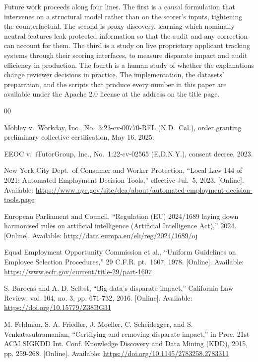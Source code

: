 \documentclass[conference]{IEEEtran}
\begin{document}
Future work proceeds along four lines. The first is a causal formulation that
intervenes on a structural model rather than on the scorer's inputs, tightening the
counterfactual. The second is proxy discovery, learning which nominally neutral
features leak protected information so that the audit and any correction can account
for them. The third is a study on live proprietary applicant tracking systems through
their scoring interfaces, to measure disparate impact and audit efficiency in
production. The fourth is a human study of whether the explanations change reviewer
decisions in practice. The implementation, the datasets' preparation, and the scripts
that produce every number in this paper are available under the Apache 2.0 license at
the address on the title page.

\begin{thebibliography}{00}
\small

 Mobley v.\ Workday, Inc., No.\ 3:23-cv-00770-RFL (N.D.\ Cal.), order granting preliminary collective certification, May 16, 2025.

 EEOC v.\ iTutorGroup, Inc., No.\ 1:22-cv-02565 (E.D.N.Y.), consent decree, 2023.

 New York City Dept.\ of Consumer and Worker Protection, ``Local Law 144 of 2021: Automated Employment Decision Tools,'' effective Jul.\ 5, 2023. [Online]. Available: \url{https://www.nyc.gov/site/dca/about/automated-employment-decision-tools.page}

 European Parliament and Council, ``Regulation (EU) 2024/1689 laying down harmonised rules on artificial intelligence (Artificial Intelligence Act),'' 2024. [Online]. Available: \url{http://data.europa.eu/eli/reg/2024/1689/oj}

 Equal Employment Opportunity Commission et al., ``Uniform Guidelines on Employee Selection Procedures,'' 29 C.F.R. pt.\ 1607, 1978. [Online]. Available: \url{https://www.ecfr.gov/current/title-29/part-1607}

 S. Barocas and A. D. Selbst, ``Big data's disparate impact,'' California Law Review, vol. 104, no. 3, pp. 671-732, 2016. [Online]. Available: \url{https://doi.org/10.15779/Z38BG31}

 M. Feldman, S. A. Friedler, J. Moeller, C. Scheidegger, and S. Venkatasubramanian, ``Certifying and removing disparate impact,'' in Proc. 21st ACM SIGKDD Int. Conf. Knowledge Discovery and Data Mining (KDD), 2015, pp. 259-268. [Online]. Available: \url{https://doi.org/10.1145/2783258.2783311}


\end{thebibliography}
\end{document}
